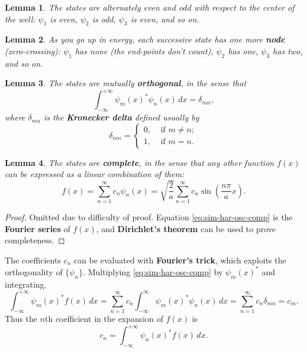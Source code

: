 \documentclass{article}
\newtheorem*{lemma*}{Lemma}
\begin{document}
\begin{lemma*}
  The states are alternately \emph{even} and \emph{odd} with respect to the
  center of the well: $\psi_1$ is even, $\psi_2$ is odd, $\psi_3$ is even, and
  so on.
\end{lemma*}

\begin{lemma*}
  As you go up in energy, each successive state has one more \textbf{node}
  (zero-crossing): $\psi_1$ has none (the end-points don't count), $\psi_2$ has
  one, $\psi_3$ has two, and so on.
\end{lemma*}

\begin{lemma*}
  The states are mutually \textbf{orthogonal}, in the sense that
  \begin{equation} \label{eq:sim-har-osc-ort}
    \int_{-\infty}^{+\infty} \psi_m(x)^* \psi_n(x) \,dx = \delta_{mn},
  \end{equation}
  where $\delta_{mn}$ is the \textbf{Kronecker delta} defined usually by
  \begin{equation} \label{eq:kro-del}
    \delta_{mn} =
    \begin{cases}
      0, &\text{ if } m \neq n; \\
      1, &\text{ if } m = n.
    \end{cases}
  \end{equation}
\end{lemma*}

\begin{lemma*}
  The states are \textbf{complete}, in the sense that any \emph{other} function
  $f(x)$ can be expressed as a linear combination of them:
  \begin{equation} \label{eq:sim-har-osc-comp}
    f(x)
    = \sum_{n = 1}^{\infty} c_n\psi_n(x)
    = \sqrt{\frac{2}{a}} \sum_{n = 1}^{\infty}
      c_n\sin\left(\frac{n\pi}{a}x\right).
  \end{equation}
\end{lemma*}
\begin{proof}
  Omitted due to difficulty of proof. Equation \eqref{eq:sim-har-osc-comp} is
  the \textbf{Fourier series} of $f(x)$, and \textbf{Dirichlet's theorem} can
  be used to prove completeness.
\end{proof}

The coefficients $c_n$ can be evaluated with \textbf{Fourier's trick}, which
exploits the orthogonality of $\{\psi_n\}$. Multiplying
\eqref{eq:sim-har-osc-comp} by $\psi_m(x)^*$ and integrating, \[
  \int_{-\infty}^{+\infty} \psi_m(x)^* f(x) \,dx
  = \sum_{n = 1}^{\infty} c_n \int_{-\infty}^{\infty}
    \psi_m(x)^* \psi_n(x)
  \,dx
  = \sum_{n = 1}^{\infty} c_n\delta_{mn}
  = c_m.
\] Thus the $n$th coefficient in the expansion of $f(x)$ is
\begin{equation} \label{eq:sim-har-osc-psi-coeff}
  \boxed{
    c_n = \int_{-\infty}^{+\infty} \psi_n(x)^* f(x) \,dx.
  }
\end{equation}
\end{document}
